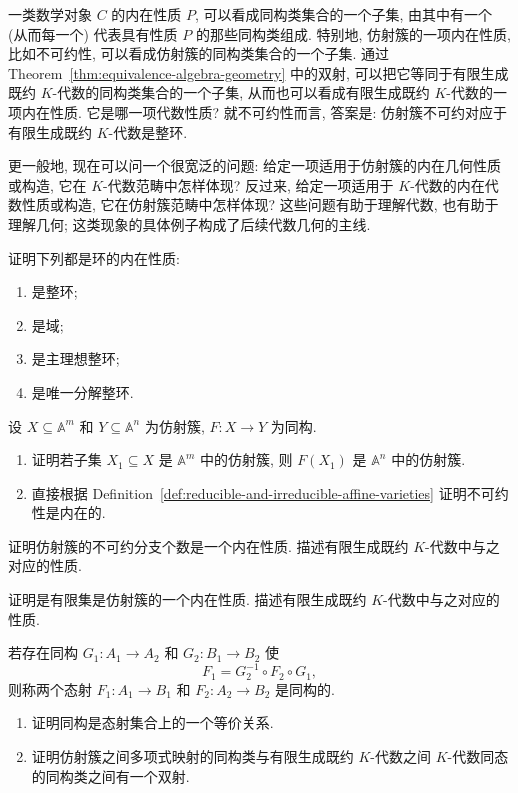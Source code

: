 一类数学对象 $C$ 的内在性质 $P$, 可以看成同构类集合的一个子集, 由其中有一个 (从而每一个) 代表具有性质 $P$ 的那些同构类组成. 特别地, 仿射簇的一项内在性质, 比如不可约性, 可以看成仿射簇的同构类集合的一个子集. 通过 Theorem~\ref{thm:equivalence-algebra-geometry} 中的双射, 可以把它等同于有限生成既约 $K$-代数的同构类集合的一个子集, 从而也可以看成有限生成既约 $K$-代数的一项内在性质. 它是哪一项代数性质? 就不可约性而言, 答案是: 仿射簇不可约对应于有限生成既约 $K$-代数是整环.

更一般地, 现在可以问一个很宽泛的问题: 给定一项适用于仿射簇的内在几何性质或构造, 它在 $K$-代数范畴中怎样体现? 反过来, 给定一项适用于 $K$-代数的内在代数性质或构造, 它在仿射簇范畴中怎样体现? 这些问题有助于理解代数, 也有助于理解几何; 这类现象的具体例子构成了后续代数几何的主线.

\BookExerciseHeading
\begin{BookExercises}
  \item\label{ex:prove-intrinsic-ring-properties} 证明下列都是环的内在性质:
    \begin{enumerate}[label=(\alph*)]
      \item 是整环;
      \item 是域;
      \item 是主理想整环;
      \item 是唯一分解整环.
    \end{enumerate}
  \item\label{ex:prove-irreducibility-intrinsic} 设 $X\subseteq\mathbb{A}^{m}$ 和 $Y\subseteq\mathbb{A}^{n}$ 为仿射簇, $F:X\to Y$ 为同构.
    \begin{enumerate}[label=(\alph*)]
      \item 证明若子集 $X_{1}\subseteq X$ 是 $\mathbb{A}^{m}$ 中的仿射簇, 则 $F(X_{1})$ 是 $\mathbb{A}^{n}$ 中的仿射簇.
      \item 直接根据 Definition~\ref{def:reducible-and-irreducible-affine-varieties} 证明不可约性是内在的.
    \end{enumerate}
  \item\label{ex:number-irreducible-components-intrinsic} 证明仿射簇的不可约分支个数是一个内在性质. 描述有限生成既约 $K$-代数中与之对应的性质.
  \item\label{ex:finiteness-of-variety-intrinsic} 证明是有限集是仿射簇的一个内在性质. 描述有限生成既约 $K$-代数中与之对应的性质.
  \item\label{ex:isomorphism-classes-of-morphisms} 若存在同构 $G_{1}:A_{1}\to A_{2}$ 和 $G_{2}:B_{1}\to B_{2}$ 使
    \[
      F_{1}=G_{2}^{-1}\circ F_{2}\circ G_{1},
    \]
    则称两个态射 $F_{1}:A_{1}\to B_{1}$ 和 $F_{2}:A_{2}\to B_{2}$ 是同构的.
    \begin{enumerate}[label=(\alph*)]
      \item 证明同构是态射集合上的一个等价关系.
      \item 证明仿射簇之间多项式映射的同构类与有限生成既约 $K$-代数之间 $K$-代数同态的同构类之间有一个双射.
    \end{enumerate}
\end{BookExercises}
